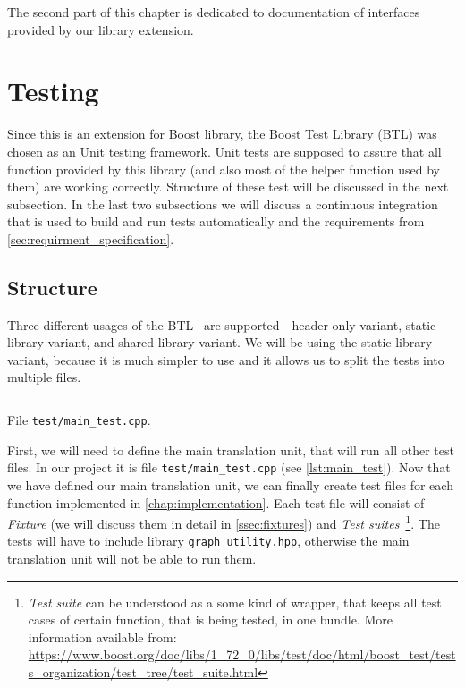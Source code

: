 \documentclass[thesis=B,english]{FITthesis}[2019/03/21]
\begin{document}
The second part of this chapter is dedicated to documentation of interfaces provided by our library extension.

\section{Testing}\label{sec_testing}
Since this is an extension for Boost library, the Boost Test Library (BTL) was chosen as an Unit testing framework. Unit tests are supposed to assure that all function provided by this library (and also most of the helper function used by them) are working correctly. Structure of these test will be discussed in the next subsection. In the last two subsections we will discuss a continuous integration that is used to build and run tests automatically and the requirements from \autoref{sec:requirment_specification}.

\subsection{Structure}
Three different usages of the BTL~\cite{boost_test_variants} are supported---header-only variant, static library variant, and shared library variant. We will be using the static library variant, because it is much simpler to use and it allows us to split the tests into multiple files.

\begin{listing}
	\inputminted[tabsize=2,breaklines,bgcolor=codebg]{c++}{snippets/main_test.m}
	\caption[File \texttt{test/main\_test.cpp}]{File \texttt{test/main\_test.cpp}.}
	\label{lst:main_test}
\end{listing}

First, we will need to define the main translation unit, that will run all other test files. In our project it is file \texttt{test/main\_test.cpp} (see \autoref{lst:main_test}). Now that we have defined our main translation unit, we can finally create test files for each function implemented in \autoref{chap:implementation}. Each test file will consist of \emph{Fixture} (we will discuss them in detail in \autoref{ssec:fixtures}) and \emph{Test suites}~\footnote{\emph{Test suite} can be understood as a some kind of wrapper, that keeps all test cases of certain function, that is being tested, in one bundle. More information available from: \url{https://www.boost.org/doc/libs/1_72_0/libs/test/doc/html/boost_test/tests_organization/test_tree/test_suite.html}}. The tests will have to include library \texttt{graph\_utility.hpp}, otherwise the main translation unit will not be able to run them.
\end{document}
